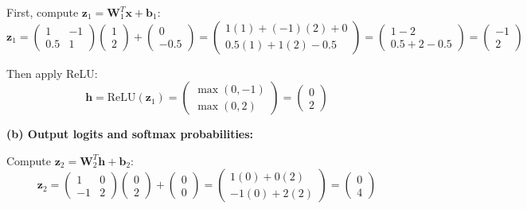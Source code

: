 \documentclass[11pt,a4paper]{article}
\begin{document}
First, compute $\mathbf{z}_1 = \mathbf{W}_1^T\mathbf{x} + \mathbf{b}_1$:
\[
\mathbf{z}_1 = \begin{pmatrix}1 & -1\\[2pt] 0.5 & 1\end{pmatrix}\begin{pmatrix}1\\[2pt] 2\end{pmatrix}
+ \begin{pmatrix}0\\[2pt] -0.5\end{pmatrix}
= \begin{pmatrix}1(1) + (-1)(2) + 0\\[2pt] 0.5(1) + 1(2) - 0.5\end{pmatrix}
= \begin{pmatrix}1 - 2\\[2pt] 0.5 + 2 - 0.5\end{pmatrix}
= \begin{pmatrix}-1\\[2pt] 2\end{pmatrix}
\]

Then apply ReLU:
\[
\mathbf{h} = \mathrm{ReLU}(\mathbf{z}_1) = \begin{pmatrix}\max(0,-1)\\[2pt] \max(0,2)\end{pmatrix}
= \begin{pmatrix}0\\[2pt] 2\end{pmatrix}
\]

\textbf{(b) Output logits and softmax probabilities:}

Compute $\mathbf{z}_2 = \mathbf{W}_2^T\mathbf{h} + \mathbf{b}_2$:
\[
\mathbf{z}_2 = \begin{pmatrix}1 & 0\\[2pt] -1 & 2\end{pmatrix}\begin{pmatrix}0\\[2pt] 2\end{pmatrix}
+ \begin{pmatrix}0\\[2pt] 0\end{pmatrix}
= \begin{pmatrix}1(0) + 0(2)\\[2pt] -1(0) + 2(2)\end{pmatrix}
= \begin{pmatrix}0\\[2pt] 4\end{pmatrix}
\]
\end{document}

